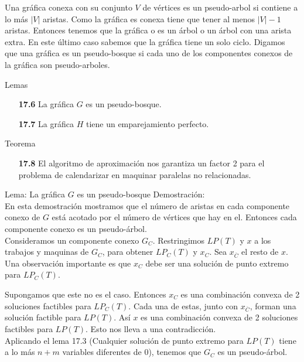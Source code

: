 \begin{frame}{\subsectiontitle}
Una gráfica conexa con su conjunto $V$ de vértices es un pseudo-arbol si contiene a lo más $|V|$ aristas. Como la gráfica es conexa tiene que tener al menos $|V|-1$ aristas. Entonces tenemos que la gráfica o es un árbol o un árbol con una arista extra. En este último caso sabemos que la gráfica tiene un solo ciclo. Digamos que una gráfica es un pseudo-bosque si cada uno de los componentes conexos de la gráfica son pseudo-arboles. 
\end{frame}

\begin{frame}{\subsectiontitle}
Lemas
\begin{enumerate}
    \item[\textbf{17.6}] La gráfica $G$ es un pseudo-bosque.
    \item[\textbf{17.7}] La gráfica $H$ tiene un emparejamiento perfecto.
    \end{enumerate}
    Teorema
    \begin{enumerate}
    \item[\textbf{17.8}] El algoritmo de aproximación nos garantiza un factor 2 para el problema de calendarizar en maquinar paralelas no relacionadas.
\end{enumerate}
\end{frame}

\begin{frame}{Lema: La gráfica $G$ es un pseudo-bosque}
Demostración:\\
En esta demostración mostramos que el número de aristas en cada componente conexo de $G$ está acotado por el número de vértices que hay en el. Entonces cada componente conexo es un pseudo-árbol.\\

\vspace{10pt}
Consideramos un componente conexo $G_C$. Restringimos $LP(T)$ y $x$ a los trabajos y maquinas de $G_C$, para obtener $LP_C(T)$ y $x_C$. Sea $x_{\overline{C}}$ el resto de $x$.\\

\vspace{5pt}
Una observación importante es que $x_C$ debe ser una solución de punto extremo para $LP_C(T)$.
\end{frame}

\begin{frame}{\subsectiontitle}
    Supongamos que este no es el caso. Entonces $x_C$ es una combinación convexa de 2 soluciones factibles para $LP_C(T)$. Cada una de estas, junto con $x_{\overline{C}}$, forman una solución factible para $LP(T)$. Así $x$ es una combinación convexa de 2 soluciones factibles para $LP(T)$. Esto nos lleva a una contradicción.\\

Aplicando el lema 17.3 (Cualquier solución de punto extremo para $LP(T)$ tiene a lo más $n+m$ variables diferentes de 0), tenemos que $G_C$ es un pseudo-árbol.
\end{frame}

